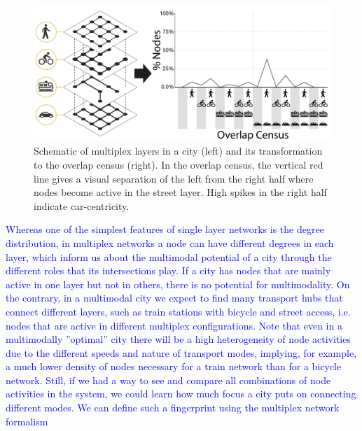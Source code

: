 \begin{figure}[th!]
	\centering
	\includegraphics[width=\textwidth]{images/multiplex/SchemaOverlapCensus.png}
	\caption[Schematic overlap census]{
		Schematic of multiplex layers in a city (left) and its transformation to the overlap census (right). In the overlap census, the vertical red line gives a visual separation of the left from the right half where nodes become active in the street layer. High spikes in the right half indicate car-centricity.}
	\label{fig:SchemaOverlapCensus}
\end{figure}

\textcolor{blue}{Whereas one of the simplest features of single layer networks is the degree distribution, in multiplex networks a node can have different degrees in each layer, which inform us about the multimodal potential of a city through the different roles that its intersections play. If a city has nodes that are mainly active in one layer but not in others, there is no potential for multimodality. On the contrary, in a multimodal city we expect to find many transport hubs that connect different layers, such as train stations with bicycle and street access, i.e. nodes that are active in different multiplex configurations. Note that even in a multimodally ”optimal” city there will be a high heterogeneity of node activities due to the different speeds and nature of transport modes, implying, for example, a much lower density of nodes necessary for a train network than for a bicycle network. Still, if we had a way to see and compare all combinations of node activities in the system, we could learn how much focus a city puts on connecting different modes. We can define such a fingerprint using the multiplex network formalism}

